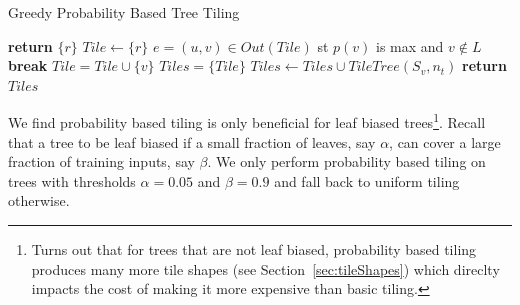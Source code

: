 \begin{algorithm}
    \caption{Greedy Probability Based Tree Tiling}
    \label{Alg:GreedyTilingAlgo}
    \begin{algorithmic}
                \State \textbf{return} $\{ r \}$
            \EndIf
            \State $Tile \leftarrow \{ r \}$
                \State $e = (u,v) \in Out(Tile)$ st $p(v)$ is max and $v \notin L$
                    \State \textbf{break}
                \EndIf
                \State $Tile = Tile \cup \{ v \}$
            \EndWhile
            \State $Tiles =  \{ Tile \}$
                \State $Tiles \leftarrow Tiles \cup TileTree(S_v, n_t)$
            \EndFor
            \State \textbf{return} $Tiles$
        \EndProcedure
    \end{algorithmic}
\end{algorithm}

We find probability based tiling is only beneficial for leaf biased trees\footnote{Turns out that for trees that are not leaf biased, probability based tiling produces many more tile shapes (see Section~\ref{sec:tileShapes}) which direclty impacts the cost of  making it more expensive than basic tiling.}.  Recall that   
a tree to be leaf biased if a small fraction of leaves, say $\alpha$, can cover a large fraction of training inputs, say $\beta$.
We only perform probability based tiling on trees with thresholds $\alpha=0.05$ and $\beta=0.9$ and fall back to uniform tiling otherwise. 



